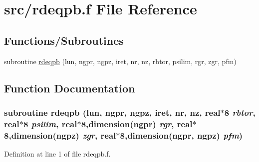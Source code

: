 \hypertarget{rdeqpb_8f}{
\section{src/rdeqpb.f File Reference}
\label{rdeqpb_8f}
}
\subsection*{Functions/Subroutines}
\begin{CompactItemize}
\item 
subroutine \hyperlink{rdeqpb_8f_d8b9400fefc2fa78c7f72d61fbe9e451}{rdeqpb} (lun, ngpr, ngpz, iret, nr, nz, rbtor, psilim, rgr, zgr, pfm)
\end{CompactItemize}


\subsection{Function Documentation}
\hypertarget{rdeqpb_8f_d8b9400fefc2fa78c7f72d61fbe9e451}{
\subsubsection[rdeqpb]{\setlength{\rightskip}{0pt plus 5cm}subroutine rdeqpb (lun, \/  ngpr, \/  ngpz, \/  iret, \/  nr, \/  nz, \/  real$\ast$8 {\em rbtor}, \/  real$\ast$8 {\em psilim}, \/  real$\ast$8,dimension(ngpr) {\em rgr}, \/  real$\ast$8,dimension(ngpz) {\em zgr}, \/  real$\ast$8,dimension(ngpr, ngpz) {\em pfm})}}
\label{rdeqpb_8f_d8b9400fefc2fa78c7f72d61fbe9e451}




Definition at line 1 of file rdeqpb.f.